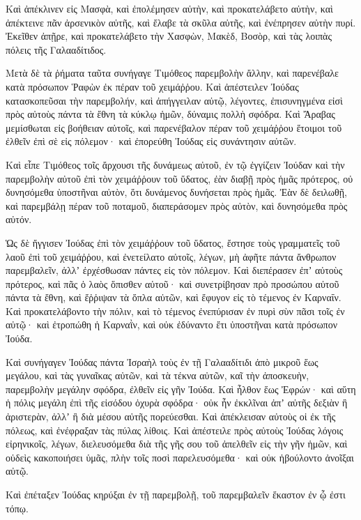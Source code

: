 {\par }{\PP {}Καὶ ἀπέκλινεν εἰς Μασφὰ, καὶ ἐπολέμησεν αὐτὴν, καὶ προκατελάβετο αὐτὴν, καὶ ἀπέκτεινε πᾶν ἀρσενικὸν αὐτῆς, καὶ ἔλαβε τὰ σκῦλα αὐτῆς, καὶ ἐνέπρησεν αὐτὴν πυρί.
Ἐκεῖθεν ἀπῇρε, καὶ προκατελάβετο τὴν Χασφὼν, Μακὲδ, Βοσὸρ, καὶ τὰς λοιπὰς πόλεις τῆς Γαλααδίτιδος.
\par }{\PP {}Μετὰ δὲ τὰ ῥήματα ταῦτα συνήγαγε Τιμόθεος παρεμβολὴν ἄλλην, καὶ παρενέβαλε κατὰ πρόσωπον Ῥαφὼν ἐκ πέραν τοῦ χειμάῤῥου.
Καὶ ἀπέστειλεν Ἰούδας κατασκοπεῦσαι τὴν παρεμβολήν, καὶ ἀπήγγειλαν αὐτῷ, λέγοντες, ἐπισυνηγμένα εἰσὶ πρὸς αὐτοὺς πάντα τὰ ἔθνη τὰ κύκλῳ ἡμῶν, δύναμις πολλὴ σφόδρα.
Καὶ Ἄραβας μεμίσθωται εἰς βοήθειαν αὐτοῖς, καὶ παρενέβαλον πέραν τοῦ χειμάῤῥου ἕτοιμοι τοῦ ἐλθεῖν ἐπὶ σὲ εἰς πόλεμον· καὶ ἐπορεύθη Ἰούδας εἰς συνάντησιν αὐτῶν.
\par }{\PP {}Καὶ εἶπε Τιμόθεος τοῖς ἄρχουσι τῆς δυνάμεως αὐτοῦ, ἐν τῷ ἐγγίζειν Ἰούδαν καὶ τὴν παρεμβολὴν αὐτοῦ ἐπὶ τὸν χειμάῤῥουν τοῦ ὕδατος, ἐὰν διαβῇ πρὸς ἡμᾶς πρότερος, οὐ δυνησόμεθα ὑποστῆναι αὐτὸν, ὅτι δυνάμενος δυνήσεται πρὸς ἡμᾶς.
Ἐὰν δὲ δειλωθῇ, καὶ παρεμβάλῃ πέραν τοῦ ποταμοῦ, διαπεράσομεν πρὸς αὐτὸν, καὶ δυνησόμεθα πρὸς αὐτόν.
\par }{\PP {}Ὡς δὲ ἤγγισεν Ἰούδας ἐπὶ τὸν χειμάῤῥουν τοῦ ὕδατος, ἔστησε τοὺς γραμματεῖς τοῦ λαοῦ ἐπὶ τοῦ χειμάῤῥου, καὶ ἐνετείλατο αὐτοῖς, λέγων, μὴ ἀφῆτε πάντα ἄνθρωπον παρεμβαλεῖν, ἀλλʼ ἐρχέσθωσαν πάντες εἰς τὸν πόλεμον.
Καὶ διεπέρασεν ἐπʼ αὐτοὺς πρότερος, καὶ πᾶς ὁ λαὸς ὅπισθεν αὐτοῦ· καὶ συνετρίβησαν πρὸ προσώπου αὐτοῦ πάντα τὰ ἔθνη, καὶ ἔῤῥιψαν τὰ ὅπλα αὐτῶν, καὶ ἔφυγον εἰς τὸ τέμενος ἐν Καρναΐν.
Καὶ προκατελάβοντο τὴν πόλιν, καὶ τὸ τέμενος ἐνεπύρισαν ἐν πυρὶ σὺν πᾶσι τοῖς ἐν αὐτῷ· καὶ ἐτροπώθη ἡ Καρναῒν, καὶ οὐκ ἐδύναντο ἔτι ὑποστῆναι κατὰ πρόσωπον Ἰούδα.
\par }{\PP {}Καὶ συνήγαγεν Ἰούδας πάντα Ἰσραὴλ τοὺς ἐν τῇ Γαλααδίτιδι ἀπὸ μικροῦ ἕως μεγάλου, καὶ τὰς γυναῖκας αὐτῶν, καὶ τὰ τέκνα αὐτῶν, καῖ τὴν ἀποσκευὴν, παρεμβολὴν μεγάλην σφόδρα, ἐλθεῖν εἰς γῆν Ἰούδα.
Καὶ ἦλθον ἕως Ἐφρών· καὶ αὕτη ἡ πόλις μεγάλη ἐπὶ τῆς εἰσόδου ὀχυρὰ σφόδρα· οὐκ ἦν ἐκκλῖναι ἀπʼ αὐτῆς δεξιὰν ἢ ἀριστερὰν, ἀλλʼ ἢ διὰ μέσου αὐτῆς πορεύεσθαι.
Καὶ ἀπέκλεισαν αὐτοὺς οἱ ἐκ τῆς πόλεως, καὶ ἐνέφραξαν τὰς πύλας λίθοις.
Καὶ ἀπέστειλε πρὸς αὐτοὺς Ἰούδας λόγοις εἰρηνικοῖς, λέγων, διελευσόμεθα διὰ τῆς γῆς σου τοῦ ἀπελθεῖν εἰς τὴν γῆν ἡμῶν, καὶ οὐδεὶς κακοποιήσει ὑμᾶς, πλὴν τοῖς ποσὶ παρελευσόμεθα· καὶ οὐκ ἠβούλοντο ἀνοῖξαι αὐτῷ.
\par }{\PP {}Καὶ ἐπέταξεν Ἰούδας κηρύξαι ἐν τῇ παρεμβολῇ, τοῦ παρεμβαλεῖν ἕκαστον ἐν ᾧ ἐστι τόπῳ.
}
